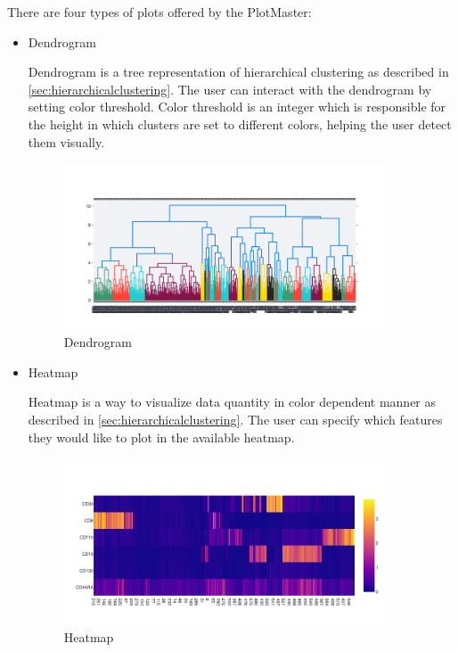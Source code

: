 There are four types of plots offered by the PlotMaster:
\begin{itemize}
    \item Dendrogram

    Dendrogram is a tree representation of hierarchical clustering as described in \ref{sec:hierarchicalclustering}. The user can interact with the dendrogram by setting color threshold. Color threshold is an integer which is responsible for the height in which clusters are set to different colors, helping the user detect them visually. 
    \begin{figure}[h!]
        \centering
        \includegraphics[width=0.9\textwidth]{Figures/dendrogramex.png}
        \caption{Dendrogram}
        \label{fig:dendrogram}
    \end{figure}

    \item Heatmap

    Heatmap is a way to visualize data quantity in color dependent manner as described in \ref{sec:hierarchicalclustering}. The user can specify which features they would like to plot in the available heatmap. 
    \begin{figure}[h!]
        \centering
        \includegraphics[width=0.9\textwidth]{Figures/heatmapex.png}
        \caption{Heatmap}
        \label{fig:heatmap}
    \end{figure}


\end{itemize}
